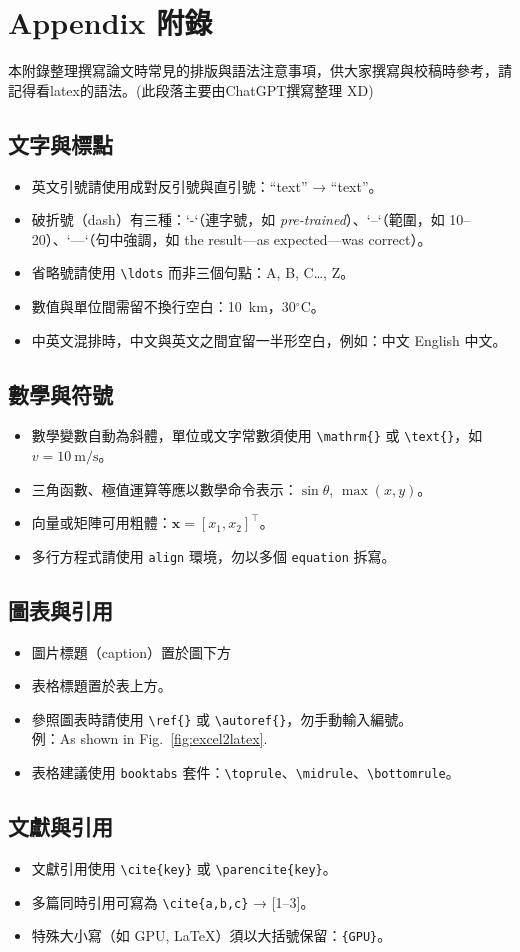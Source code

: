 \chapter{Appendix 附錄}
\label{ch:appendix}

本附錄整理撰寫論文時常見的排版與語法注意事項，供大家撰寫與校稿時參考，請記得看latex的語法。(此段落主要由ChatGPT撰寫整理 XD)

\section*{文字與標點}
\begin{itemize}
  \item 英文引號請使用成對反引號與直引號：``text'' → “text”。
  \item 破折號（dash）有三種：`-`（連字號，如 \textit{pre-trained}）、`--`（範圍，如 10--20）、`---`（句中強調，如 the result---as expected---was correct）。
  \item 省略號請使用 \verb|\ldots| 而非三個句點：A, B, C\ldots, Z。
  \item 數值與單位間需留不換行空白：10~km，30$^\circ$C。
  \item 中英文混排時，中文與英文之間宜留一半形空白，例如：中文 English 中文。
\end{itemize}

\section*{數學與符號}
\begin{itemize}
  \item 數學變數自動為斜體，單位或文字常數須使用 \verb|\mathrm{}| 或 \verb|\text{}|，如 $v=10~\mathrm{m/s}$。
  \item 三角函數、極值運算等應以數學命令表示：$\sin\theta$, $\max(x,y)$。
  \item 向量或矩陣可用粗體：$\mathbf{x}=[x_1,x_2]^\top$。
  \item 多行方程式請使用 \texttt{align} 環境，勿以多個 \texttt{equation} 拆寫。
\end{itemize}


\section*{圖表與引用}
\begin{itemize}
  \item 圖片標題（caption）置於圖下方
  \item 表格標題置於表上方。
  \item 參照圖表時請使用 \verb|\ref{}| 或 \verb|\autoref{}|，勿手動輸入編號。\\
        例：As shown in Fig.~\ref{fig:excel2latex}.
  \item 表格建議使用 \texttt{booktabs} 套件：\verb|\toprule|、\verb|\midrule|、\verb|\bottomrule|。
\end{itemize}

\section*{文獻與引用}
\begin{itemize}
  \item 文獻引用使用 \verb|\cite{key}| 或 \verb|\parencite{key}|。
  \item 多篇同時引用可寫為 \verb|\cite{a,b,c}| → [1–3]。
  \item 特殊大小寫（如 GPU, LaTeX）須以大括號保留：\verb|{GPU}|。
\end{itemize}

